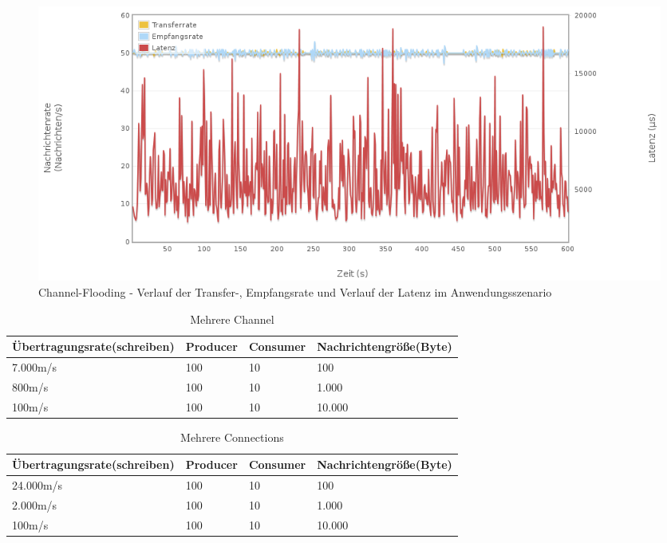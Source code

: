 \documentclass[	a4paper,
			11pt,
			oneside,
			parskip]{scrartcl}
\begin{document}
		\begin{figure}[!htb]
			\centering
			\includegraphics[width=\textwidth]{img/channel/channel_scenario.png}
			\caption{Channel-Flooding - Verlauf der Transfer-, Empfangsrate und Verlauf der Latenz im Anwendungsszenario}
			\label{fig:channel-scenario}
		\end{figure}
		
		\begin{table}[!htb]
			\centering
			\begin{tabular}{p{3cm}llp{3cm}}
				Übertragungsrate\newline (schreiben) & Producer & Consumer & Nachrichtengröße\newline (Byte) \\ \hline
				7.000m/s                             & 100      & 10       & 100                              \\
				800m/s                               & 100      & 10       & 1.000                            \\
				100m/s                               & 100      & 10       & 10.000
			\end{tabular}
			\caption{Mehrere Channel}
		\end{table}

		\begin{table}[!htb]
			\centering
			\begin{tabular}{p{3cm}llp{3cm}}
				Übertragungsrate\newline (schreiben) & Producer & Consumer & Nachrichtengröße\newline (Byte) \\ \hline
				24.000m/s                            & 100      & 10       & 100                             \\
				2.000m/s                             & 100      & 10       & 1.000                           \\
				100m/s                               & 100      & 10       & 10.000
			\end{tabular}
			\caption{Mehrere Connections}
		\end{table}
	
\end{document}
